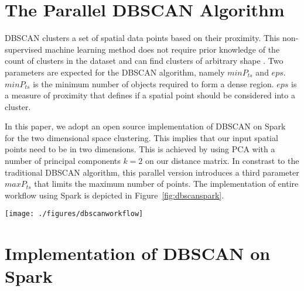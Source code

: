 \section{The Parallel DBSCAN Algorithm}

DBSCAN clusters a set of spatial data points based on their proximity. This non-supervised machine learning method does not require prior knowledge of the count of clusters in the dataset and can find clusters of arbitrary shape \cite{dbscan}. Two parameters are expected for the DBSCAN algorithm, namely $minP_{ts}$ and $eps$. $minP_{ts}$ is the minimum number of objects required to form a dense region. $eps$ is a measure of proximity that defines if a spatial point should be considered into a cluster. 

In this paper, we adopt an open source implementation of DBSCAN on Spark~\cite{irvingdbscan} for the two dimensional space clustering. This implies that our input spatial points need to be in two dimensions. This is achieved by using PCA with a number of principal components $k=2$ on our distance matrix. In constrast to the traditional DBSCAN algorithm, this parallel version introduces a third parameter $maxP_{ts}$ that limits the maximum number of points. The implementation of entire workflow using Spark is depicted in Figure~\ref{fig:dbscanspark}.

\begin{figure*}
    \centering
	\texttt{[image: ./figures/dbscanworkflow]}
	\caption{Overview of DBSCANs workflow adapted for Spark. The distance matrix is the starting point of our workflow where each cell is the coefficient obtained from the distance function applied to $X_i$ and $X_j$. Then the distance matrix is transformed by PCA. In this case, we keep the first two components. These two components are used as spatial coordinates. Each pair of cells is represented as a point in the spatial plot. Eventually DBSCAN is applied to identify clusters.}
	\label{fig:dbscanspark}
\end{figure*}


\section{Implementation of DBSCAN on Spark}


